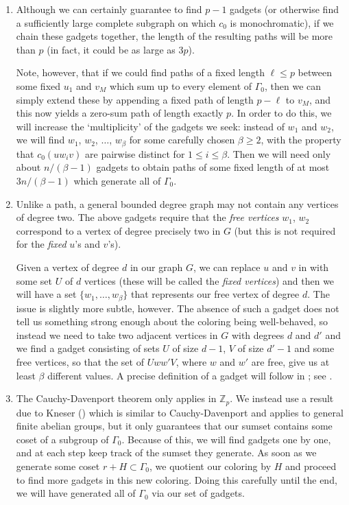 \documentclass{article}
\theoremstyle{definition}
\begin{document}
\begin{enumerate}
    \item Although we can certainly guarantee to find $p-1$ gadgets (or otherwise find a sufficiently large complete subgraph on which $c_0$ is monochromatic), if we chain these gadgets together, the length of the resulting paths will be more than $p$ (in fact, it could be as large as $3p$).
    
    Note, however, that if we could find paths of a fixed length $\ell\leq p$ between some fixed $u_1$ and $v_M$ which sum up to every element of $\Gamma_0$, then we can simply extend these by appending a fixed path of length $p-\ell$ to $v_M$, and this now yields a zero-sum path of length exactly $p$. In order to do this, we will increase the `multiplicity' of the gadgets we seek: instead of $w_1$ and $w_2$, we will find $w_1$, $w_2$,  $\ldots$, $w_\beta$ for some carefully chosen $\beta\geq 2$, with the property that $c_0(uw_iv)$ are pairwise distinct for $1\leq i\leq \beta$. Then we will need only about $ n/(\beta-1)$ gadgets to obtain paths of some fixed length of at most $3n/(\beta-1)$ which generate all of $\Gamma_0$. \label{multiplicity}
    
    \item Unlike a path, a general bounded degree graph may not contain any vertices of degree two. The above gadgets require that the \emph{free vertices} $w_1$, $w_2$ correspond to a vertex of degree precisely two in $G$ (but this is not required for the \emph{fixed} $u$'s and $v$'s).

     Given a vertex of degree $d$ in our graph $G$, we can replace $u$ and $v$ in  with some set $U$ of $d$ vertices (these will be called the \emph{fixed vertices}) and then we will have a set $\{w_1,\ldots,w_\beta\}$ that represents our free vertex of degree $d$. The issue is slightly more subtle, however. The absence of such a gadget does not tell us something strong enough about the coloring being well-behaved, so instead we need to take two adjacent vertices in $G$ with degrees $d$ and $d'$ and we find a gadget consisting of sets $U$ of size $d-1$, $V$ of size $d'-1$ and some free vertices, so that the set of $Uww'V$, where $w$ and $w'$ are free, give us at least $\beta$ different values. A precise definition of a gadget will follow in ; see . \label{degree}
     
    \item The Cauchy-Davenport theorem only applies in $\mathbb{Z}_p$. We instead use a result due to Kneser () which is similar to Cauchy-Davenport and applies to general finite abelian groups, but it only guarantees that our sumset contains some coset of a subgroup of $\Gamma_0$. Because of this, we will find gadgets one by one, and at each step keep track of the sumset they generate. As soon as we generate some coset $r+H\subset \Gamma_0$, we quotient our coloring by $H$ and proceed to find more gadgets in this new coloring. Doing this carefully until the end, we will have generated all of $\Gamma_0$ via our set of gadgets.\label{CD_problem}
    

\end{enumerate}
\end{document}
